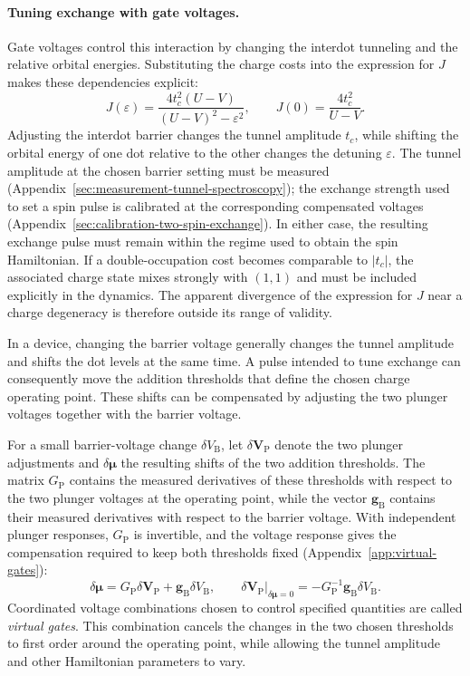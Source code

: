 \paragraph{Tuning exchange with gate voltages.}
Gate voltages control this interaction by changing the interdot
tunneling and the relative orbital energies. Substituting the charge
costs into the expression for $J$ makes these dependencies explicit:
\begin{equation}
  J(\varepsilon)=\frac{4t_c^2(U-V)}{(U-V)^2-\varepsilon^2},\qquad
  J(0)=\frac{4t_c^2}{U-V}.
  \label{eq:exchange-detuning}
\end{equation}
Adjusting the interdot barrier changes the tunnel amplitude $t_c$,
while shifting the orbital energy of one dot relative to the other
changes the detuning $\varepsilon$. The tunnel amplitude at the
chosen barrier setting must be measured
(Appendix~\ref{sec:measurement-tunnel-spectroscopy}); the exchange
strength used to set a spin pulse is calibrated at the corresponding
compensated voltages (Appendix~\ref{sec:calibration-two-spin-exchange}).
In either case, the resulting
exchange pulse must remain within the regime used to obtain the
spin Hamiltonian. If a double-occupation cost becomes comparable
to $|t_c|$, the associated charge state mixes strongly with $(1,1)$
and must be included explicitly in the dynamics. The apparent
divergence of the expression for $J$ near a charge degeneracy is
therefore outside its range of validity.

In a device, changing the barrier voltage generally changes the
tunnel amplitude and shifts the dot levels at the same time. A pulse intended to tune
exchange can consequently move the addition thresholds that define
the chosen charge operating point. These shifts can be compensated
by adjusting the two plunger voltages together with the barrier
voltage.

For a small barrier-voltage change $\delta V_{\mathrm B}$, let
$\delta\mathbf V_{\mathrm P}$ denote the two plunger adjustments
and $\delta\boldsymbol\mu$ the resulting shifts of the two addition
thresholds. The matrix $G_{\mathrm P}$ contains the measured
derivatives of these thresholds with respect to the two plunger
voltages at the operating point, while the vector $\mathbf g_{\mathrm B}$
contains their measured derivatives with respect to the barrier
voltage. With independent plunger responses,
$G_{\mathrm P}$ is invertible, and the voltage response gives the
compensation required to keep both thresholds fixed
(Appendix~\ref{app:virtual-gates}):
\begin{equation}
 \delta\boldsymbol\mu
    =G_{\mathrm P}\delta\mathbf V_{\mathrm P}
          +\mathbf g_{\mathrm B}\delta V_{\mathrm B},
 \qquad
 \left.\delta\mathbf V_{\mathrm P}\right|_{\delta\boldsymbol\mu=0}
    =-G_{\mathrm P}^{-1}\mathbf g_{\mathrm B}\delta V_{\mathrm B}.
 \label{eq:platform-compensated-voltage}
\end{equation}
Coordinated voltage combinations chosen to control specified
quantities are called \emph{virtual gates}. This combination cancels
the changes in the two chosen thresholds to first order around the
operating point, while allowing the tunnel amplitude and other
Hamiltonian parameters to vary.

